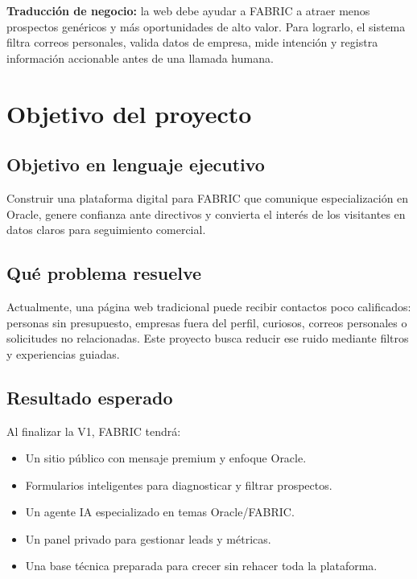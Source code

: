 \documentclass[11pt,letterpaper]{article}
\begin{document}
\textbf{Traducci\'on de negocio:} la web debe ayudar a FABRIC a atraer menos prospectos gen\'ericos y m\'as oportunidades de alto valor. Para lograrlo, el sistema filtra correos personales, valida datos de empresa, mide intenci\'on y registra informaci\'on accionable antes de una llamada humana.

\section{Objetivo del proyecto}

\subsection{Objetivo en lenguaje ejecutivo}

Construir una plataforma digital para FABRIC que comunique especializaci\'on en Oracle, genere confianza ante directivos y convierta el inter\'es de los visitantes en datos claros para seguimiento comercial.

\subsection{Qu\'e problema resuelve}

Actualmente, una p\'agina web tradicional puede recibir contactos poco calificados: personas sin presupuesto, empresas fuera del perfil, curiosos, correos personales o solicitudes no relacionadas. Este proyecto busca reducir ese ruido mediante filtros y experiencias guiadas.

\subsection{Resultado esperado}

Al finalizar la V1, FABRIC tendr\'a:

\begin{itemize}
\item Un sitio p\'ublico con mensaje premium y enfoque Oracle.
\item Formularios inteligentes para diagnosticar y filtrar prospectos.
\item Un agente IA especializado en temas Oracle/FABRIC.
\item Un panel privado para gestionar leads y m\'etricas.
\item Una base t\'ecnica preparada para crecer sin rehacer toda la plataforma.
\end{itemize}
\end{document}
